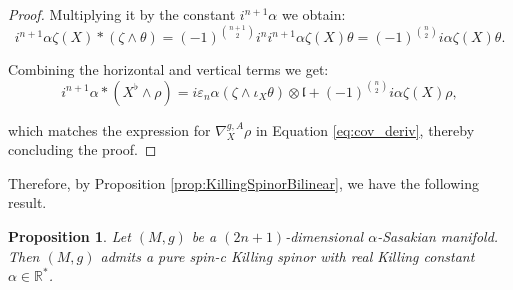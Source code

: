 \documentclass[10pt,a4paper,twoside,reqno]{amsart}
\theoremstyle{plain}
\newtheorem{prop}[thm]{Proposition}
\theoremstyle{definition}
\theoremstyle{remark}
\begin{document}
\begin{proof}
\noindent
Multiplying it by the constant $i^{n+1}\alpha$ we obtain:
\begin{equation*}
i^{n+1}\alpha\zeta(X)*(\zeta\wedge\theta)=(-1)^{\binom{n+1}{2}}i^ni^{n+1}\alpha\zeta(X)\theta=(-1)^{\binom{n}{2}}i\alpha\zeta(X)\theta.
\end{equation*}

\noindent
Combining the horizontal and vertical terms we get:
\begin{equation*}
i^{n+1}\alpha *(X^{\flat} \wedge \rho) = i\varepsilon_n\alpha(\zeta \wedge \iota_{X}\theta) \otimes \mathfrak{l} + (-1)^{\binom{n}{2}}i\alpha\zeta(X)\rho,
\end{equation*}

\noindent
which matches the expression for $\nabla_{X}^{g,A}\rho$ in Equation \eqref{eq:cov_deriv}, thereby concluding the proof.
\end{proof}

Therefore, by Proposition \ref{prop:KillingSpinorBilinear}, we have the following result.

\begin{prop}
Let $(M,g)$ be a $(2n+1)$-dimensional $\alpha$-Sasakian manifold. Then $(M,g)$ admits a pure spin-c Killing spinor with real Killing constant $\alpha\in\mathbb{R}^{\ast}$.
\end{prop}




\end{document}
